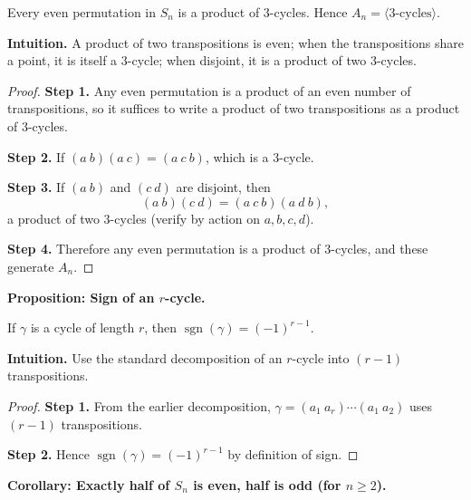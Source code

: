 \documentclass[9pt]{article}
\theoremstyle{definition}
\begin{document}
\newpage

Every even permutation in $S_n$ is a product of $3$-cycles. Hence $A_n=\langle\text{$3$-cycles}\rangle$.

\dotfill

\noindent\textbf{Intuition.}
A product of two transpositions is even; when the transpositions share a point, it is itself a $3$-cycle; when disjoint, it is a product of two $3$-cycles.

\dotfill

\begin{proof}
\textbf{Step 1.} Any even permutation is a product of an even number of transpositions, so it suffices to write a product of two transpositions as a product of $3$-cycles.

\textbf{Step 2.} If $(a\ b)(a\ c)=(a\ c\ b)$, which is a $3$-cycle.

\textbf{Step 3.} If $(a\ b)$ and $(c\ d)$ are disjoint, then
\[
(a\ b)(c\ d)=(a\ c\ b)(a\ d\ b),
\]
a product of two $3$-cycles (verify by action on $a,b,c,d$).

\textbf{Step 4.} Therefore any even permutation is a product of $3$-cycles, and these generate $A_n$.
\end{proof}

\newpage


\noindent\textbf{Proposition: Sign of an $r$-cycle.}

\newpage

If $\gamma$ is a cycle of length $r$, then $\operatorname{sgn}(\gamma)=(-1)^{r-1}$.

\dotfill

\noindent\textbf{Intuition.}
Use the standard decomposition of an $r$-cycle into $(r-1)$ transpositions.

\dotfill

\begin{proof}
\textbf{Step 1.} From the earlier decomposition, $\gamma=(a_1\ a_r)\cdots(a_1\ a_2)$ uses $(r-1)$ transpositions.

\textbf{Step 2.} Hence $\operatorname{sgn}(\gamma)=(-1)^{r-1}$ by definition of sign.
\end{proof}

\newpage


\noindent\textbf{Corollary: Exactly half of $S_n$ is even, half is odd (for $n\ge2$).}

\newpage
\end{document}
